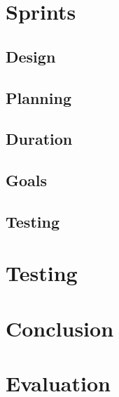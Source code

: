 \documentclass[10pt,a4paper,oneside]{report}
\begin{document}
\chapter{Sprints}
\section{Design}
\section{Planning}
\section{Duration}
\section{Goals}
\section{Testing}

\chapter{Testing}

\chapter{Conclusion}

\chapter{Evaluation}
\end{document}
